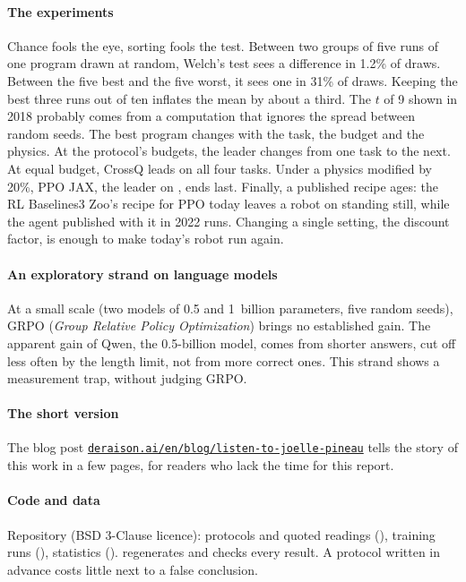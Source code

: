 \paragraph{The experiments}
Chance fools the eye, sorting fools the test. Between two groups of five runs of one program drawn at
random, Welch's test sees a difference in 1.2\% of draws. Between the five best and the five worst, it
sees one in 31\% of draws. Keeping the best three runs out of ten inflates the mean by about a third.
The $t$ of 9 shown in 2018 probably comes from a computation that ignores the spread between random
seeds. The best program changes with the task, the budget and the physics. At the protocol's budgets, the
leader changes from one task to the next. At equal budget, CrossQ leads on all four tasks. Under a
physics modified by 20\%, PPO JAX, the leader on , ends last.
Finally, a published recipe ages: the RL Baselines3 Zoo's recipe for PPO today leaves a robot on 
standing still, while the agent published with it in 2022 runs. Changing a single setting, the discount
factor, is enough to make today's robot run again.

\paragraph{An exploratory strand on language models}
At a small scale (two models of 0.5 and 1~billion parameters, five random seeds), GRPO
(\emph{Group Relative Policy Optimization}) brings no
established gain. The apparent gain of Qwen, the 0.5-billion model, comes from
shorter answers, cut off less often by the length limit, not from more
correct ones. This strand shows a measurement trap, without judging GRPO.

\paragraph{The short version}
The blog post \href{https://deraison.ai/en/blog/listen-to-joelle-pineau}{\texttt{deraison.ai/en/blog/listen-to-joelle-pineau}}
tells the story of this work in a few pages, for readers who lack the time for this report.

\paragraph{Code and data}
Repository \repo{} (BSD 3-Clause licence): protocols and quoted readings (), training runs
(), statistics ().  regenerates and checks every
result. A protocol written in advance costs little next to a false conclusion.
